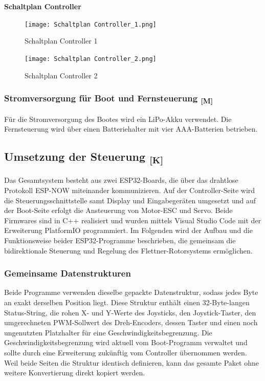 \documentclass[a4paper,12pt]{article}
\begin{document}
\newpage
\textbf{Schaltplan Controller}

\begin{figure}[H]
    \centering
    \texttt{[image: Schaltplan Controller\_1.png]}
    \caption{Schaltplan Controller 1}
    \label{fig:Schaltplan Controller 1}
\end{figure}

\begin{figure}[H]
    \centering
    \texttt{[image: Schaltplan Controller\_2.png]}
    \caption{Schaltplan Controller 2}
    \label{fig:Schaltplan Controller 2}
\end{figure}

\subsubsection{\texorpdfstring{Stromversorgung für Boot und Fernsteuerung \textsubscript{[M]}}{Stromversorgung für Boot und Fernsteuerung [M]}}

Für die Stromversorgung des Bootes wird ein LiPo-Akku verwendet. Die Fernsteuerung wird über einen Batteriehalter mit vier AAA-Batterien betrieben.\cite{LiPo_Akku}\cite{Batterie_Halter}

\newpage

\subsection{\texorpdfstring{Umsetzung der Steuerung \textsubscript{[K]}}{Umsetzung der Steuerung [K]}}

Das Gesamtsystem besteht aus zwei ESP32-Boards, die über das drahtlose Protokoll ESP-NOW miteinander kommunizieren. Auf der Controller-Seite wird die Steuerungsschnittstelle samt Display und Eingabegeräten umgesetzt und auf der Boot-Seite erfolgt die Ansteuerung von Motor-ESC und Servo. Beide Firmwares sind in C++ realisiert und wurden mittels Visual Studio Code mit der Erweiterung PlatformIO programmiert. Im Folgenden wird der Aufbau und die Funktionsweise beider ESP32-Programme beschrieben, die gemeinsam die bidirektionale Steuerung und Regelung des Flettner-Rotorsystems ermöglichen. 


\subsubsection{Gemeinsame Datenstrukturen}

Beide Programme verwenden dieselbe gepackte Datenstruktur, sodass jedes Byte an exakt derselben Position liegt. Diese Struktur enthält einen 32-Byte-langen Status-String, die rohen X- und Y-Werte des Joysticks, den Joystick-Taster, den umgerechneten PWM-Sollwert des Dreh-Encoders, dessen Taster und einen noch ungenutzten Platzhalter für eine Geschwindigkeitsbegrenzung. Die Geschwindigkeitsbegrenzung wird aktuell vom Boot-Programm verwaltet und sollte durch eine Erweiterung zukünftig vom Controller übernommen werden. Weil beide Seiten die Struktur identisch definieren, kann das gesamte Paket ohne weitere Konvertierung direkt kopiert werden.
\end{document}
